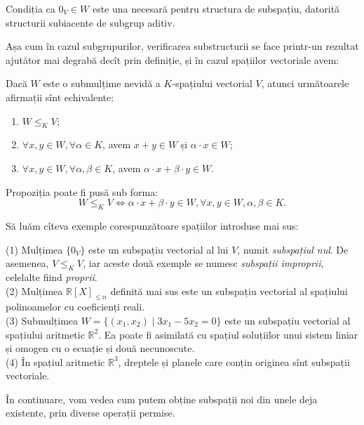 \begin{remark}
Condiția ca $0_V \in W$ este una necesară pentru structura de subspațiu, 
datorită structurii subiacente de subgrup aditiv.
\end{remark}

Așa cum în cazul subgrupurilor, verificarea substructurii se face printr-un 
rezultat ajutător mai degrabă decît prin definiție, și în cazul spațiilor 
vectoriale avem:
\begin{proposition}
Dacă $W$ este o submulțime nevidă a $K$-spațiului vectorial $V$, atunci 
următoarele afirmații sînt echivalente:
\begin{enumerate}[(1)]
\item $W \leq_K V$;
\item $\forall x,y \in W, \forall \alpha \in K$, avem $x + y \in W$ și 
$\alpha \cdot x \in W$;
\item $\forall x,y \in W, \forall \alpha, \beta \in K$, avem 
$\alpha \cdot x + \beta \cdot y \in W$.
\end{enumerate}
\end{proposition}

Propoziția poate fi pusă sub forma: 
\[
W \leq_K V \Longleftrightarrow \alpha \cdot x + \beta \cdot y \in W, 
\forall x,y \in W, \alpha, \beta \in K.
\]

Să luăm cîteva exemple corespunzătoare spațiilor introduse mai sus:
\begin{example}
(1) Mulțimea $\{0_V\}$ este un subspațiu vectorial al lui $V$, numit 
\emph{subspațiul nul}. De asemenea, $V \leq_K V$, iar aceste două exemple 
se numesc \emph{subspații improprii}, celelalte fiind \emph{proprii}. \\

(2) Mulțimea $\mathbb{R}[X]_{\leq n}$ definită mai sus este un subspațiu 
vectorial al spațiului polinoamelor cu coeficienți reali. \\

(3) Submulțimea $W = \{ (x_1, x_2) \mid 3x_1 - 5x_2 = 0 \}$ este un subspațiu 
vectorial al spațiului aritmetic $\mathbb{R}^2$. Ea poate fi asimilată cu 
spațiul soluțiilor unui sistem liniar și omogen cu o ecuație și două 
necunoscute. \\

(4) În spațiul aritmetic $\mathbb{R}^3$, dreptele și planele care conțin 
originea sînt subspații vectoriale.
\end{example}

În continuare, vom vedea cum putem obține subspații noi din unele deja 
existente, prin diverse operații permise.

